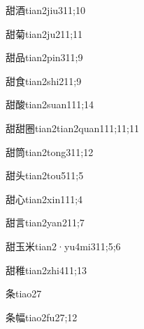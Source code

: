 \begin{verbete}{甜酒}{tian2jiu3}{11;10}
\end{verbete}
\begin{verbete}{甜菊}{tian2ju2}{11;11}
\end{verbete}
\begin{verbete}{甜品}{tian2pin3}{11;9}
\end{verbete}
\begin{verbete}{甜食}{tian2shi2}{11;9}
\end{verbete}
\begin{verbete}{甜酸}{tian2suan1}{11;14}
\end{verbete}
\begin{verbete}{甜甜圈}{tian2tian2quan1}{11;11;11}
\end{verbete}
\begin{verbete}{甜筒}{tian2tong3}{11;12}
\end{verbete}
\begin{verbete}{甜头}{tian2tou5}{11;5}
\end{verbete}
\begin{verbete}{甜心}{tian2xin1}{11;4}
\end{verbete}
\begin{verbete}{甜言}{tian2yan2}{11;7}
\end{verbete}
\begin{verbete}{甜玉米}{tian2·yu4mi3}{11;5;6}
\end{verbete}
\begin{verbete}{甜稚}{tian2zhi4}{11;13}
\end{verbete}
\begin{verbete}{条}{tiao2}{7}
\end{verbete}
\begin{verbete}{条幅}{tiao2fu2}{7;12}
\end{verbete}
